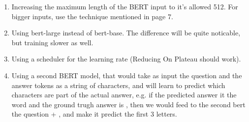 \documentclass[12pt]{report}
\begin{document}
\begin{enumerate}
    \item Increasing the maximum length of the BERT input to it's allowed 512. For
        bigger inputs, use the  technique mentioned in page 7.
    \item Using bert-large instead of bert-base. The difference will be quite noticable,
        but training slower as well.
    \item Using a scheduler for the learning rate (Reducing On Plateau should work).
    \item Using a second BERT model, that would take as input the question and the answer
        tokens as a string of characters, and will learn to predict which characters
        are part of the actual answer, e.g. if the predicted answer it the word
         and the ground trugh answer is , then we would
        feed to the second bert the question + , and make it predict
        the first 3 letters.
\end{enumerate}
\end{document}

